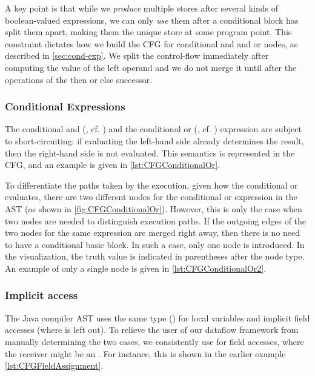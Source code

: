 A key point is that while we \emph{produce} multiple stores after several kinds of boolean-valued expressions, we can only \emph{use} them after a conditional block has split them apart, making them the unique store at some program point.  This constraint dictates how we build the CFG for conditional and and or nodes, as described in \autoref{sec:cond-exp}.  We split the control-flow immediately after computing the value of the left operand and we do not merge it until after the operations of the then or else successor.


\subsubsection{Conditional Expressions}
\label{sec:cond-exp}

The conditional and (\code{&&}, cf. ) and the conditional
or (\code{||}, cf. ) expression are subject to short-circuiting:
if evaluating the left-hand side already determines the result, then the right-hand
side is not evaluated. This semantics is represented in the CFG, and an example
is given in \autoref{lst:CFGConditionalOr}.

To differentiate the paths taken by the execution, given how the conditional or evaluates,
there are two different nodes for the conditional or expression in the AST
(as shown in \autoref{fig:CFGConditionalOr}). However, this is only the case when
two nodes are needed to distinguish execution paths. If the outgoing edges
of the two nodes for the same expression are merged right away, then there is
no need to have a conditional basic block. In such a case, only one
node is introduced. In the visualization, the truth value is indicated in
parentheses after the node type. An example of only a single node is given in
\autoref{lst:CFGConditionalOr2}.




\subsubsection{Implicit  access}

The Java compiler AST uses the same type () for local variables
and implicit field accesses (where  is left out).
To relieve the user of our dataflow framework from manually determining
the two cases, we consistently use  for field accesses,
where the receiver might be an .
For instance, this is shown in the earlier example \autoref{lst:CFGFieldAssignment}.



